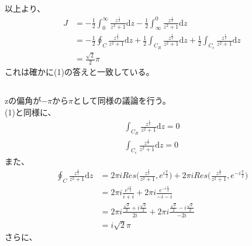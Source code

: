 \documentclass[dvipdfmx,a4paper]{jsarticle}
\begin{document}
 以上より、
 \begin{align*}
 J &= -\frac{1}{2}\int_{0}^{\infty} \frac{z^{\frac{1}{2}}}{z^2 + 1} \mathrm{d}z - \frac{1}{2}\int_{\infty}^{0} \frac{z^{\frac{1}{2}}}{z^2 + 1} \mathrm{d}z \\
 &=-\frac{1}{2}\oint_C\frac{z^{\frac{1}{2}}}{z^2 + 1}\mathrm{d}z + \frac{1}{2}\int_{C_R}\frac{z^{\frac{1}{2}}}{z^2 + 1}\mathrm{d}z + \frac{1}{2}\int_{C_{\epsilon}}\frac{z^{\frac{1}{2}}}{z^2 + 1}\mathrm{d}z\\
 &= \frac{\sqrt{2}}{2}\pi
 \end{align*}
 これは確かに(1)の答えと一致している。\\
 
 \subsection{}
 zの偏角が$-\pi$から$\pi$として同様の議論を行う。\\
 (1)と同様に、
 \begin{align*}
 \int_{C_R}\frac{z^{\frac{1}{2}}}{z^2 + 1}\mathrm{d}z = 0\\
\int_{C_{\epsilon}}\frac{z^{\frac{1}{2}}}{z^2 + 1}\mathrm{d}z = 0
 \end{align*}
 また、
 \begin{align*}
 \oint_C\frac{z^{\frac{1}{2}}}{z^2 + 1}\mathrm{d}z &= 2\pi iRes\biggl(\frac{z^{\frac{1}{2}}}{z^2 + 1}, e^{i\frac{\pi}{2}}\biggr) + 2\pi iRes\biggl(\frac{z^{\frac{1}{2}}}{z^2 + 1}, e^{-i\frac{\pi}{2}}\biggr)\\
 &= 2\pi i\frac{e^{i\frac{\pi}{4}}}{i + i} + 2\pi i\frac{e^{-i\frac{\pi}{4}}}{-i - i}\\
 &= 2\pi i\frac{\frac{\sqrt{2}}{2} + i\frac{\sqrt{2}}{2}}{2i} + 2\pi i\frac{\frac{\sqrt{2}}{2} - i\frac{\sqrt{2}}{2}}{-2i}\\
 &= i\sqrt{2}\pi
 \end{align*}
 さらに、
\end{document}
